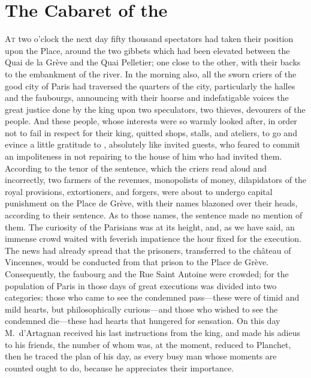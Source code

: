 \chapter{The Cabaret of the }

\lettrine{A}{t} two o'clock the next day fifty thousand spectators had taken their position upon the Place, around the two gibbets which had been elevated between the Quai de la Grève and the Quai Pelletier; one close to the other, with their backs to the embankment of the river. In the morning also, all the sworn criers of the good city of Paris had traversed the quarters of the city, particularly the halles and the faubourgs, announcing with their hoarse and indefatigable voices the great justice done by the king upon two speculators, two thieves, devourers of the people. And these people, whose interests were so warmly looked after, in order not to fail in respect for their king, quitted shops, stalls, and ateliers, to go and evince a little gratitude to , absolutely like invited guests, who feared to commit an impoliteness in not repairing to the house of him who had invited them. According to the tenor of the sentence, which the criers read aloud and incorrectly, two farmers of the revenues, monopolists of money, dilapidators of the royal provisions, extortioners, and forgers, were about to undergo capital punishment on the Place de Grève, with their names blazoned over their heads, according to their sentence. As to those names, the sentence made no mention of them. The curiosity of the Parisians was at its height, and, as we have said, an immense crowd waited with feverish impatience the hour fixed for the execution. The news had already spread that the prisoners, transferred to the château of Vincennes, would be conducted from that prison to the Place de Grève. Consequently, the faubourg and the Rue Saint Antoine were crowded; for the population of Paris in those days of great executions was divided into two categories: those who came to see the condemned pass—these were of timid and mild hearts, but philosophically curious—and those who wished to see the condemned die—these had hearts that hungered for sensation. On this day M.~d'Artagnan received his last instructions from the king, and made his adieus to his friends, the number of whom was, at the moment, reduced to Planchet, then he traced the plan of his day, as every busy man whose moments are counted ought to do, because he appreciates their importance.

